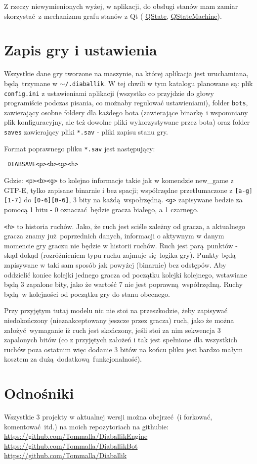 \documentclass[a4paper,12pt]{article}
\begin{document}
Z rzeczy niewymienionych wyżej, w aplikacji, do obsługi stanów mam zamiar skorzystać z mechanizmu grafu stanów z Qt (
\href{http://qt-project.org/doc/qt-4.8/qstate.html}{QState}, \href{http://qt-project.org/doc/qt-4.8/qstatemachine.html}{QStateMachine}). 
\section{Zapis gry i ustawienia}
Wszystkie dane gry tworzone na maszynie, na której aplikacja jest uruchamiana, będą trzymane w $\sim$\verb|/.diaballik|. W tej chwili w tym
katalogu planowane są: plik \verb|config.ini| z ustawieniami aplikacji (wszystko co przyjdzie do głowy programiście podczas pisania, co możnaby
regulować ustawieniami), folder \verb|bots|, zawierający osobne foldery dla każdego bota (zawierające binarkę i wspomniany plik konfiguracyjny, 
ale też dowolne pliki wykorzystywane przez bota) oraz folder \verb|saves| zawierający pliki \verb|*.sav| - pliki zapisu stanu gry.

Format poprawnego pliku \verb|*.sav| jest następujący: 
\begin{verbatim}
 DIABSAVE<p><b><g><h>
\end{verbatim}
Gdzie: \verb|<p><b><g>| to kolejno informacje takie jak w komendzie new\_game z GTP-E, tylko zapisane binarnie i bez spacji; współrzędne przetłumaczone
z \verb|[a-g][1-7]| do \verb|[0-6][0-6]|, 3 bity na każdą wspołrzędną. \verb|<g>| zapisywane bedzie za pomocą 1 bitu - 0 oznaczać będzie gracza
białego, a 1 czarnego.

\verb|<h>| to historia ruchów. Jako, że ruch jest sciśle zależny od gracza, a aktualnego gracza znamy już poprzednich danych, informacji o aktywnym 
w danym momencie gry graczu nie będzie w historii ruchów. Ruch jest parą punktów - skąd dokąd (rozróżnieniem typu ruchu zajmuje się logika gry).
Punkty będą zapisywane w taki sam sposób jak powyżej (binarnie) bez odstępów. Aby oddzielić koniec kolejki jednego gracza od początku kolejki 
kolejnego, wstawiane będą 3 zapalone bity, jako że wartość 7 nie jest poprawną współrzędną. Ruchy będą w kolejności od początku gry do stanu 
obecnego.

Przy przyjętym tutaj modelu nic nie stoi na przeszkodzie, żeby zapisywać niedokończony (niezaakceptowany jeszcze przez gracza) ruch, jako że można
założyć wymaganie iż ruch jest skończony, jeśli stoi za nim sekwencja 3 zapalonych bitów (co z przyjętych założeń i tak jest spełnione dla wszystkich
ruchów poza ostatnim więc dodanie 3 bitów na końcu pliku jest bardzo małym kosztem za dużą dodatkową funkcjonalność).

\section{Odnośniki}
Wszystkie 3 projekty w aktualnej wersji można obejrzeć (i forkować, komentować itd.) na moich repozytoriach na githubie:\linebreak
\url{https://github.com/Tommalla/DiaballikEngine}\linebreak 
\url{https://github.com/Tommalla/DiaballikBot}\linebreak
\url{https://github.com/Tommalla/Diaballik}
\end{document}
